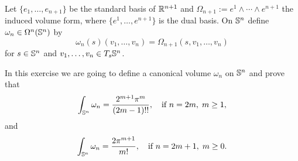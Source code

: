 \begin{exercise}
	Let $\{e_1,\ldots,e_{n+1}\}$ be the standard basis of $\mathbb{R}^{n+1}$ and $\Omega_{n+1} := e^1\wedge\cdots\wedge e^{n+1}$ the induced volume form, where $\{e^1,\ldots,e^{n+1}\}$ is the dual basis.
	On $\mathbb{S}^n$ define $\omega_n\in\Omega^n(\mathbb{S}^n)$ by
	\begin{equation}
		\omega_n(s)(v_1, \ldots, v_n) = \Omega_{n+1}(s, v_1, \ldots, v_n)
	\end{equation}
	for $s\in\mathbb{S}^n$ and $v_1,\ldots,v_n\in T_s\mathbb{S}^n$.

	In this exercise we are going to define a canonical volume $\omega_n$ on $\mathbb{S}^n$ and prove that
	\begin{equation}
		\int_{\mathbb{S}^n} \omega_n = \frac{2^{m+1}\pi^m}{(2m-1)!!}, \quad\mbox{if } n=2m,\; m\geq 1,
	\end{equation}
	and
	\begin{equation}
		\int_{\mathbb{S}^n} \omega_n = \frac{2\pi^{m+1}}{m!}, \quad\mbox{if } n=2m+1,\; m\geq 0.
	\end{equation}


\end{exercise}
